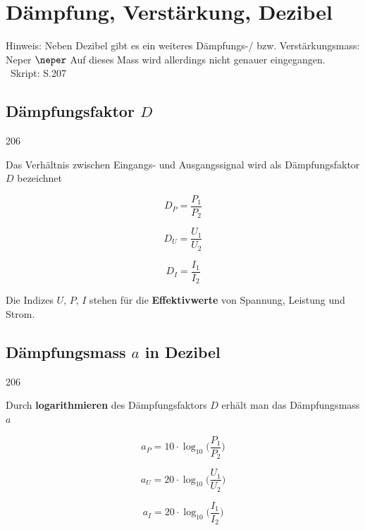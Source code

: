 \section{Dämpfung, Verstärkung, Dezibel}

Hinweis: Neben Dezibel gibt es ein weiteres Dämpfungs-/ bzw. Verstärkungsmass: Neper $\neper$
Auf dieses Mass wird allerdings nicht genauer eingegangen. \textrightarrow\ Skript: S.207


\subsection{Dämpfungsfaktor \texorpdfstring{$D$}{D}}{206}

Das Verhältnis zwischen Eingangs- und Ausgangssignal wird als Dämpfungsfaktor $D$ bezeichnet

\begin{minipage}[c]{0.3\columnwidth}
    $$ \boxed{ D_{P} = \frac{P_{1}}{P_{2}} } $$
\end{minipage}
\hfill
\begin{minipage}[c]{0.3\columnwidth}
    $$ \boxed{ D_{U} = \frac{U_{1}}{U_{2}} } $$
\end{minipage}
\hfill
\begin{minipage}[c]{0.3\columnwidth}
    $$ \boxed{ D_{I} = \frac{I_{1}}{I_{2}} } $$
\end{minipage}

Die Indizes $U$, $P$, $I$ stehen für die \textbf{Effektivwerte} von Spannung, Leistung und Strom.


\subsection{Dämpfungsmass \texorpdfstring{$a$}{a} in Dezibel}{206}

Durch \textbf{logarithmieren} des Dämpfungsfaktors $D$ erhält man das Dämpfungsmass $a$

\begin{minipage}[c]{0.3\columnwidth}
    $$ \boxed{ a_{P} =  10 \cdot \log_{10} \Big( \frac{P_{1}}{P_{2}} \Big) } $$
\end{minipage}
\hfill
\begin{minipage}[c]{0.3\columnwidth}
    $$ \boxed{ a_{U} = 20 \cdot \log_{10} \Big( \frac{U_{1}}{U_{2}} \Big) } $$
\end{minipage}
\hfill
\begin{minipage}[c]{0.3\columnwidth}
    $$ \boxed{ a_{I} = 20 \cdot \log_{10} \Big( \frac{I_{1}}{I_{2}} \Big) } $$
\end{minipage}


